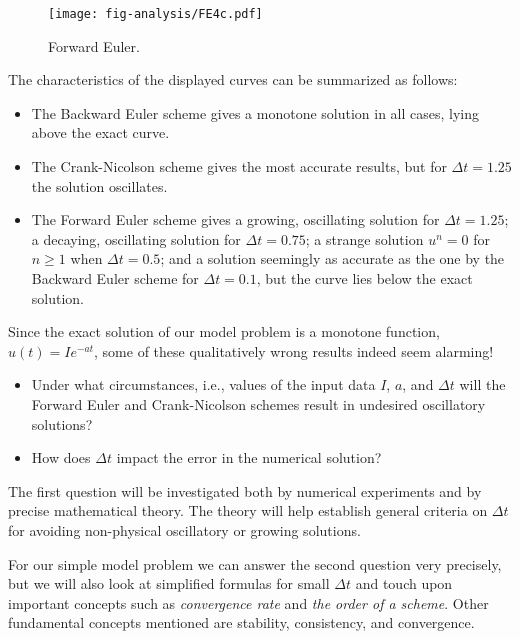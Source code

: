 \documentclass[graybox,sectrefs,envcountresetchap,open=right,final]{svmonodo}
\newenvironment{notice_mdfboxadmon}[1][]{
\begin{notice_mdfboxmdframed}[frametitle=#1]
}
{
\end{notice_mdfboxmdframed}
}
\begin{document}
\begin{figure}[!ht]  %
  \centerline{\texttt{[image: fig-analysis/FE4c.pdf]}}
  \caption{
  Forward Euler. \label{decay:analysis:FE4c}
  }
\end{figure}

The characteristics of the displayed curves can be summarized as follows:

\begin{itemize}
  \item The Backward Euler scheme gives a monotone solution in all cases, lying above the exact curve.

  \item The Crank-Nicolson scheme gives the most accurate results, but for $\Delta t=1.25$ the solution oscillates.

  \item The Forward Euler scheme gives a growing, oscillating solution for $\Delta t=1.25$; a decaying, oscillating solution for $\Delta t=0.75$; a strange solution $u^n=0$ for $n\geq 1$ when $\Delta t=0.5$; and a solution seemingly as accurate as the one by the Backward Euler scheme for $\Delta t = 0.1$, but the curve lies below the exact solution.
\end{itemize}

\noindent
Since the exact solution of our model problem is a monotone function,
$u(t)=Ie^{-at}$, some of these qualitatively wrong results indeed seem alarming!


\begin{notice_mdfboxadmon}

\begin{itemize}
 \item Under what circumstances, i.e., values of the input data $I$, $a$, and $\Delta t$ will the Forward Euler and Crank-Nicolson schemes result in undesired oscillatory solutions?

 \item How does $\Delta t$ impact the error in the numerical solution?
\end{itemize}

\noindent
The first question will be investigated both by numerical experiments and
by precise mathematical theory. The theory will help establish
general criteria on $\Delta t$ for avoiding non-physical oscillatory
or growing solutions.

For our simple model problem we can answer the second
question very precisely, but
we will also look at simplified formulas for small $\Delta t$
and touch upon important concepts such as \emph{convergence rate} and
\emph{the order of a scheme}. Other fundamental concepts mentioned are
stability, consistency, and convergence.
\end{notice_mdfboxadmon} %
\end{document}
